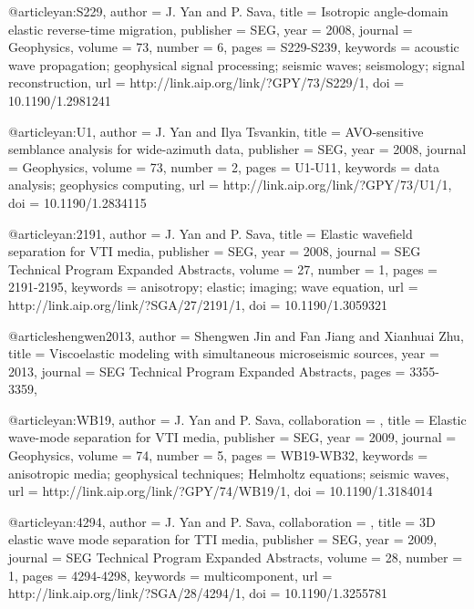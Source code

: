@article{yan:S229,
  author =	 {J. Yan and P. Sava},
  title =	 {Isotropic angle-domain elastic reverse-time
                  migration},
  publisher =	 {SEG},
  year =	 2008,
  journal =	 {Geophysics},
  volume =	 73,
  number =	 6,
  pages =	 {S229-S239},
  keywords =	 {acoustic wave propagation; geophysical signal
                  processing; seismic waves; seismology; signal
                  reconstruction},
  url =		 {http://link.aip.org/link/?GPY/73/S229/1},
  doi =		 {10.1190/1.2981241}
}

@article{yan:U1,
  author =	 {J. Yan and Ilya Tsvankin},
  title =	 {AVO-sensitive semblance analysis for wide-azimuth
                  data},
  publisher =	 {SEG},
  year =	 2008,
  journal =	 {Geophysics},
  volume =	 73,
  number =	 2,
  pages =	 {U1-U11},
  keywords =	 {data analysis; geophysics computing},
  url =		 {http://link.aip.org/link/?GPY/73/U1/1},
  doi =		 {10.1190/1.2834115}
}

@article{yan:2191,
  author =	 {J. Yan and P. Sava},
  title =	 {Elastic wavefield separation for {VTI} media},
  publisher =	 {SEG},
  year =	 2008,
  journal =	 {SEG Technical Program Expanded Abstracts},
  volume =	 27,
  number =	 1,
  pages =	 {2191-2195},
  keywords =	 {anisotropy; elastic; imaging; wave equation},
  url =		 {http://link.aip.org/link/?SGA/27/2191/1},
  doi =		 {10.1190/1.3059321}
}


@article{shengwen2013,
  author =	 {Shengwen Jin and Fan Jiang and Xianhuai Zhu},
  title =	 {Viscoelastic modeling with simultaneous microseismic sources},
  year =	 2013,
  journal =	 {SEG Technical Program Expanded Abstracts},
  pages =	 {3355-3359},
}

@article{yan:WB19,
author = {J. Yan and P. Sava},
collaboration = {},
title = {Elastic wave-mode separation for {VTI} media},
publisher = {SEG},
year = {2009},
journal = {Geophysics},
volume = {74},
number = {5},
pages = {WB19-WB32},
keywords = {anisotropic media; geophysical techniques; Helmholtz equations; seismic waves},
url = {http://link.aip.org/link/?GPY/74/WB19/1},
doi = {10.1190/1.3184014}
}




@article{yan:4294,
author = {J. Yan and P. Sava},
collaboration = {},
title = {3{D} elastic wave mode separation for {TTI} media},
publisher = {SEG},
year = {2009},
journal = {SEG Technical Program Expanded Abstracts},
volume = {28},
number = {1},
pages = {4294-4298},
keywords = {multicomponent},
url = {http://link.aip.org/link/?SGA/28/4294/1},
doi = {10.1190/1.3255781}
}







